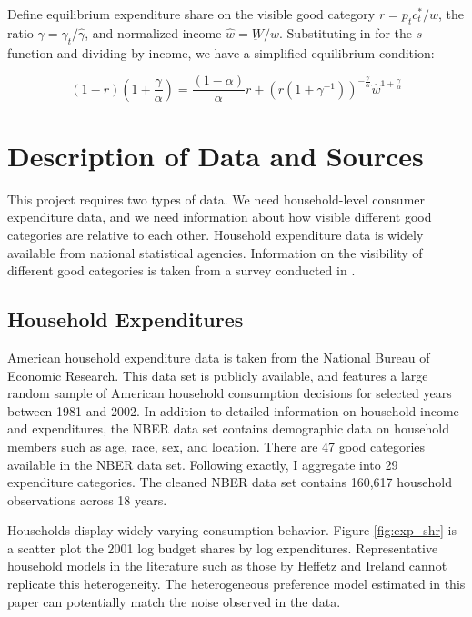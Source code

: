 \documentclass[12pt]{article}
\begin{document}
Define equilibrium expenditure share on the visible good category $r = p_t c_t^* / w$, the ratio $\gamma = \gamma_t / \hat{\gamma}$, and normalized income $\hat{w} = \underbar{W} / w$.  Substituting in for the $s$ function and dividing by income, we have a simplified equilibrium condition:

\begin{equation}
	\label{eq:eq_cond}
    (1 - r)(1 + \frac{\gamma}{\alpha}) = \frac{\left(1-\alpha\right)}{\alpha} r +  \left(r\left(1 + \gamma^{-1}\right)\right)^{-\frac{\gamma}{\alpha}}\hat{w}^{1+\frac{\gamma}{\alpha}}
\end{equation}

\section{Description of Data and Sources}
This project requires two types of data.  We need household-level consumer expenditure data, and we need information about how visible different good categories are relative to each other.  Household expenditure data is widely available from national statistical agencies.  Information on the visibility of different good categories is taken from a survey conducted in \citet{Heffetz2011}.

\subsection{Household Expenditures}
American household expenditure data is taken from the National Bureau of Economic Research.\citep{NBERCEX2011}  This data set is publicly available, and features a large random sample of American household consumption decisions for selected years between 1981 and 2002.  In addition to detailed information on household income and expenditures, the NBER data set contains demographic data on household members such as age, race, sex, and location.
There are 47 good categories available in the NBER data set.
Following \citet{Heffetz2011} exactly,\footnotemark{} I aggregate into 29 expenditure categories.
The cleaned NBER data set contains 160,617 household observations across 18 years.

Households display widely varying consumption behavior.  Figure \ref{fig:exp_shr} is a scatter plot the 2001 log budget shares by log expenditures.  Representative household models in the literature such as those by Heffetz and Ireland cannot replicate this heterogeneity.\footnotemark{} The heterogeneous preference model estimated in this paper can potentially match the noise observed in the data.
\end{document}
